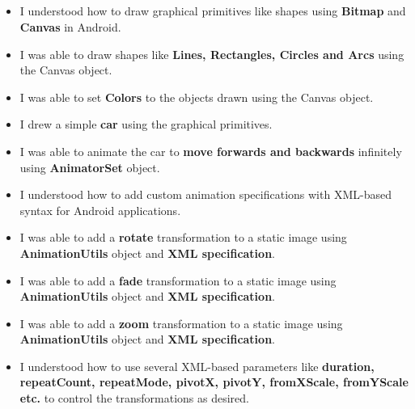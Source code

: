 \documentclass[12pt, a4]{article}
\begin{document}
\subsection*{}
\begin{itemize}
\item I understood how to draw graphical primitives like shapes using \textbf{Bitmap} and \textbf{Canvas} in Android.
\item I was able to draw shapes like \textbf{Lines, Rectangles, Circles and Arcs} using the Canvas object.
\item I was able to set \textbf{Colors} to the objects drawn using the Canvas object.
\item I drew a simple \textbf{car} using the graphical primitives.
\item I was able to animate the car to \textbf{move forwards and backwards} infinitely using \textbf{AnimatorSet} object.
\item I understood how to add custom animation specifications with XML-based syntax for Android applications.
\item I was able to add a \textbf{rotate} transformation to a static image using \textbf{AnimationUtils} object and \textbf{XML specification}.
\item I was able to add a \textbf{fade} transformation to a static image using \textbf{AnimationUtils} object and \textbf{XML specification}.
\item I was able to add a \textbf{zoom} transformation to a static image using \textbf{AnimationUtils} object and \textbf{XML specification}.
\item I understood how to use several XML-based parameters like \textbf{duration, repeatCount, repeatMode, pivotX, pivotY, fromXScale, fromYScale etc.} to control the transformations as desired.
\end{itemize}
\end{document}
